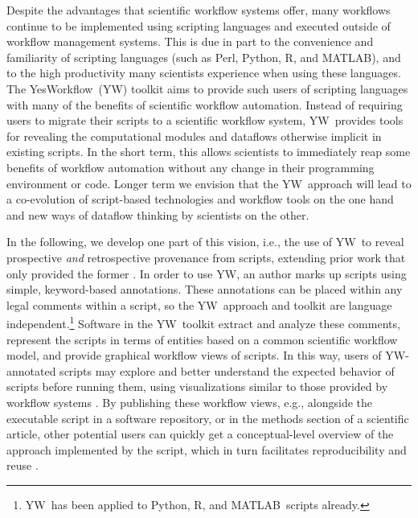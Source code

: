 \documentclass[nocopyrightspace]{sigplanconf}
\newcommand{\YW}{\textsf{YesWorkflow}}
\newcommand{\yw}{\textsf{YW}}
\newcommand{\R}{\textsf{R}}
\newcommand{\MATLAB}{\textsf{MATLAB}}
\begin{document}
Despite the advantages that scientific workflow systems offer, many
workflows continue to be implemented using scripting languages and
executed outside of workflow management systems. This is due in part
to the convenience and familiarity of scripting languages (such as
Perl, Python, \R, and \MATLAB), and to the high productivity many
scientists experience when using these languages. The \YW\ (\yw)
toolkit \cite{yw-website,mcphillips2015ywIJDC} aims to provide such
users of scripting languages with many of the benefits of scientific
workflow automation. Instead of requiring users to migrate their
scripts to a scientific workflow system, \yw\ provides tools for
revealing the computational modules and dataflows otherwise implicit
in existing scripts. In the short term, this allows scientists to
immediately reap some benefits of workflow automation without any
change in their programming environment or code. Longer term we
envision that the \yw\ approach will lead to a co-evolution of
script-based technologies and workflow tools on the one hand and new
ways of dataflow thinking by %
scientists on the other.

In the following, we develop one part of this vision, i.e., the use of
\yw\ to reveal prospective \emph{and} retrospective provenance
\cite{zhao2006applying} from scripts, extending prior work that only
provided the former \cite{mcphillips2015ywIJDC}.
In order to use \yw, an author marks up scripts using simple,
keyword-based annotations. These annotations can be placed within any
legal comments within a script, so the \yw\ approach and toolkit are 
language independent.\footnote{\yw\ has been applied to
  Python, \R, and \MATLAB\ scripts already.}  %
%
Software in the \yw\ toolkit extract and analyze these comments,
represent the scripts in terms of entities based on a common
scientific workflow model, and provide graphical workflow views of
scripts. In this way, users of \yw-annotated scripts may explore and
better understand the expected behavior of scripts before running
them, using visualizations similar to those provided by workflow
systems 
\cite{ludascher2006scientific,wolstencroft2013taverna,freire2014reproducibility}.
By publishing these workflow views, e.g., alongside the executable
script in a software repository, or in the methods section of a
scientific article, other potential users can quickly get a
conceptual-level overview of the approach implemented by the script,
which in turn facilitates reproducibility and reuse
\cite{gandrud2013reproducible,stodden2014implementing}.
\end{document}
